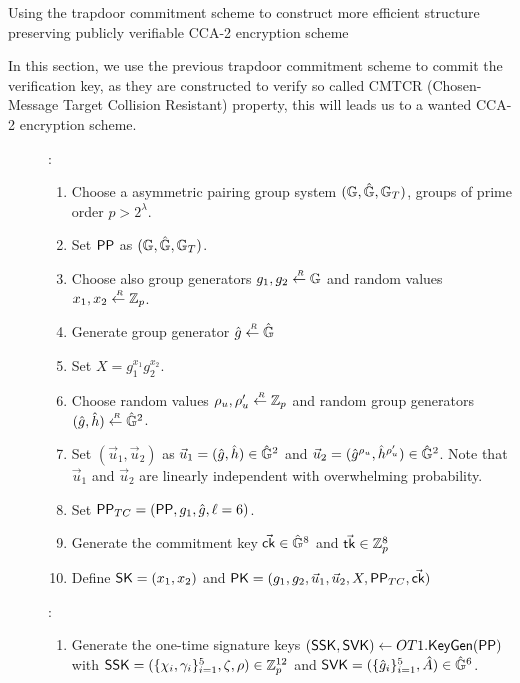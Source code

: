 \begin{section}{Using the trapdoor commitment scheme to construct more efficient structure preserving publicly verifiable CCA-2 encryption scheme}
	
	In this section, we use the previous trapdoor commitment scheme to commit the verification key, as they are constructed to verify so called CMTCR (Chosen-Message Target Collision Resistant) property, this will leads us to a wanted CCA-2 encryption scheme.
	    \begin{description}

    \item[]:
      \begin{enumerate}
      \item Choose a asymmetric pairing group system $(\mathbb{G}, \hat{\mathbb{G}}, \mathbb{G}_T)$, groups of prime order $p > 2^\lambda$.
      \item Set $\mathsf{PP}$ as $(\mathbb{G}, \hat{\mathbb{G}}, \mathbb{G}_T)$.
      \item Choose also group generators $g_1, g_2 \stackrel{{\scriptscriptstyle \mkern4mu R}}{\gets} \mathbb{G}$ and random values $x_1, x_2 \stackrel{{\scriptscriptstyle \mkern4mu R}}{\gets} \mathbb{Z}_p$.
      \item Generate group generator $\hat{g} \stackrel{{\scriptscriptstyle \mkern4mu R}}{\gets} \hat{\mathbb{G}}$
      \item Set $X = g_1^{x_1}g_2^{x_2}$.
      \item Choose random values $\rho_u,\rho_u' \stackrel{{\scriptscriptstyle \mkern4mu R}}{\gets} \mathbb{Z}_p$ and random group generators $(\hat{g}, \hat{h}) \stackrel{{\scriptscriptstyle \mkern4mu R}}{\gets} \hat{\mathbb{G}}^2$.
      \item Set $(\vec{u}_1, \vec{u}_2)$ as $\vec{u}_1 = (\hat{g}, \hat{h}) \in \hat{\mathbb{G}}^2$ and $\vec{u}_2 =  (\hat{g}^{\rho_u}, \hat{h}^{\rho_u'}) \in \hat{\mathbb{G}}^2$. Note that $\vec{u}_1$ and $\vec{u}_2$ are linearly independent with overwhelming probability.
      \item Set $\mathsf{PP}_{TC} = (\mathsf{PP}, g_1, \hat{g}, \ell = 6)$.
      \item Generate the commitment key $\vec{\mathsf{ck}} \in \hat{\mathbb{G}}^8$ and $\vec{\mathsf{tk}} \in \mathbb{Z}_p^8$
      \item Define $\mathsf{SK} = (x_1, x_2)$ and $\mathsf{PK} = (g_1, g_2, \vec{u}_1, \vec{u}_2, X, \mathsf{PP}_{TC}, \vec{\mathsf{ck}})$
      \end{enumerate}
    \item[]:
      \begin{enumerate}
      \item Generate the one-time signature keys $(\mathsf{SSK}, \mathsf{SVK}) \gets OT1.{\mathsf{KeyGen}}(\mathsf{PP})$ with $\mathsf{SSK} = (\{\chi_i, \gamma_i\}_{i=1}^5, \zeta, \rho) \in \mathbb{Z}_p^{12}$ and $\mathsf{SVK} =  (\{\hat{g}_i\}_{i =1}^5,  \hat{A} ) \in \hat{\mathbb{G}}^6$.

\end{enumerate}
\end{description}
\end{section}
